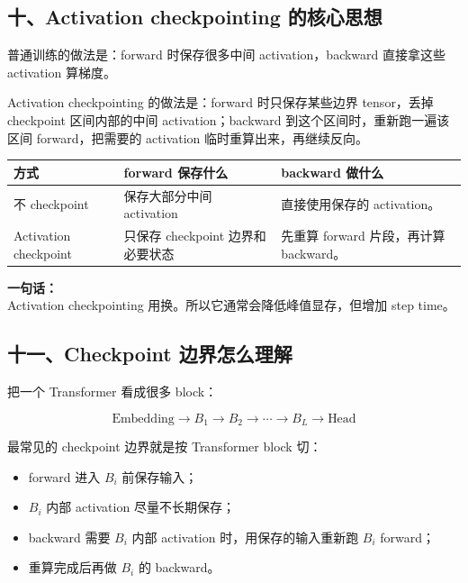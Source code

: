 \subsection{十、Activation checkpointing 的核心思想}

普通训练的做法是：forward 时保存很多中间 activation，backward 直接拿这些 activation 算梯度。

Activation checkpointing 的做法是：forward 时只保存某些边界 tensor，丢掉 checkpoint 区间内部的中间 activation；backward 到这个区间时，重新跑一遍该区间 forward，把需要的 activation 临时重算出来，再继续反向。

\begin{center}
{\small
\begin{tabular}{p{3.5cm}p{4.4cm}p{4.5cm}}
\hline
\textbf{方式} & \textbf{forward 保存什么} & \textbf{backward 做什么} \\
\hline
不 checkpoint & 保存大部分中间 activation & 直接使用保存的 activation。 \\
Activation checkpoint & 只保存 checkpoint 边界和必要状态 & 先重算 forward 片段，再计算 backward。 \\
\hline
\end{tabular}
}
\end{center}

\begin{summarybox}
\textbf{一句话：}\\
Activation checkpointing 用换。所以它通常会降低峰值显存，但增加 step time。
\end{summarybox}

\subsection{十一、Checkpoint 边界怎么理解}

把一个 Transformer 看成很多 block：

\[
\text{Embedding} \rightarrow B_1 \rightarrow B_2 \rightarrow \cdots \rightarrow B_L \rightarrow \text{Head}
\]

最常见的 checkpoint 边界就是按 Transformer block 切：

\begin{itemize}[leftmargin=1.5em]
  \item forward 进入 $B_i$ 前保存输入；
  \item $B_i$ 内部 activation 尽量不长期保存；
  \item backward 需要 $B_i$ 内部 activation 时，用保存的输入重新跑 $B_i$ forward；
  \item 重算完成后再做 $B_i$ 的 backward。
\end{itemize}

